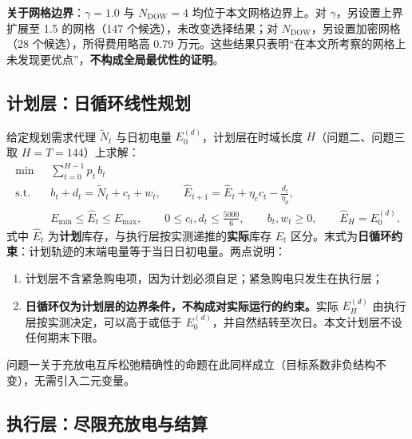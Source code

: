 \textbf{关于网格边界}：$\gamma=1.0$ 与 $N_{\mathrm{DOW}}=4$ 均位于本文网格边界上。对 $\gamma$，另设置上界扩展至 1.5 的网格（147 个候选），未改变选择结果；对 $N_{\mathrm{DOW}}$，另设置加密网格（28 个候选），所得费用略高 0.79 万元。这些结果只表明``在本文所考察的网格上未发现更优点''，\textbf{不构成全局最优性的证明}。

\subsection{计划层：日循环线性规划}
\label{sec:q2-lp}

给定规划需求代理 $\widetilde N_t$ 与日初电量 $E_0^{(d)}$，计划层在时域长度 $H$（问题二、问题三取 $H=T=144$）上求解：
\begin{align}
  \min\ & \sum_{t=0}^{H-1} p_t\, b_t \\
  \text{s.t.}\quad
  & b_t+d_t=\widetilde N_t+c_t+w_t,\qquad \widehat E_{t+1}=\widehat E_t+\eta_c c_t-\frac{d_t}{\eta_d}, \\
  & E_{\min}\le \widehat E_t\le E_{\max},\qquad 0\le c_t,d_t\le \tfrac{5000}{6},\qquad b_t,w_t\ge 0,\qquad \widehat E_H=E_0^{(d)} .
\end{align}
式中 $\widehat E_t$ 为\textbf{计划}库存，与执行层按实测递推的\textbf{实际}库存 $E_t$ 区分。末式为\textbf{日循环约束}：计划轨迹的末端电量等于当日日初电量。两点说明：
\begin{enumerate}
  \item 计划层不含紧急购电项，因为计划必须自足；紧急购电只发生在执行层；
  \item \textbf{日循环仅为计划层的边界条件，不构成对实际运行的约束。}实际 $E_H^{(d)}$ 由执行层按实测决定，可以高于或低于 $E_0^{(d)}$，并自然结转至次日。本文计划层不设任何期末下限。
\end{enumerate}
问题一关于充放电互斥松弛精确性的命题在此同样成立（目标系数非负结构不变），无需引入二元变量。

\subsection{执行层：尽限充放电与结算}
\label{sec:q2-exec}

